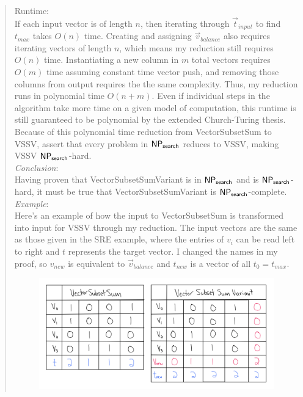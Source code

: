 \documentclass[11pt]{article}
\begin{document}
\begin{quote}
    Runtime: \\
    If each input vector is of length $n$, then iterating through $\Vec{t}_{input}$ to find $t_{max}$ takes $O(n)$ time. Creating and assigning $\Vec{v}_{balance}$ also requires iterating vectors of length $n$, which means my reduction still requires $O(n)$ time. Instantiating a new column in $m$ total vectors requires $O(m)$ time assuming constant time vector push, and removing those columns from output requires the the same complexity. Thus, my reduction runs in polynomial time $O(n + m)$. Even if individual steps in the algorithm take more time on a given model of computation, this runtime is still guaranteed to be polynomial by the extended Church-Turing thesis. \\

    Because of this polynomial time reduction from VectorSubsetSum to VSSV, assert that every problem in $\mathsf{NP_{search}}$ reduces to VSSV, making VSSV $\mathsf{NP_{search}}$-hard. \\ 

    \textit{Conclusion}: \\
    Having proven that VectorSubsetSumVariant is in $\mathsf{NP_{search}}$ and is $\mathsf{NP_{search}}$-hard, it must be true that VectorSubsetSumVariant is $\mathsf{NP_{search}}$-complete. \\

    \textit{Example}: \\
    Here's an example of how the input to VectorSubsetSum is transformed into input for VSSV through my reduction. The input vectors are the same as those given in the SRE example, where the entries of $v_i$ can be read left to right and $t$ represents the target vector. I changed the names in my proof, so $v_{new}$ is equivalent to $\Vec{v}_{balance}$ and $t_{new}$ is a vector of all $t_0 = t_{max}$.
    
    \noindent
    \begin{figure}[ht]
        \includegraphics[scale=0.4]{vssv reduction example.png} 
    \end{figure}
    \end{quote}
    
\end{document}
